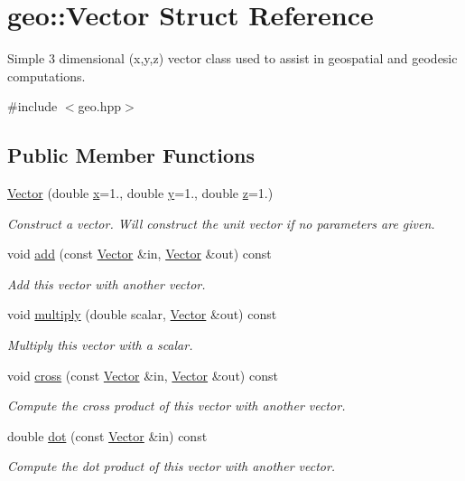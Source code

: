 \hypertarget{structgeo_1_1Vector}{}\section{geo\+:\+:Vector Struct Reference}
\label{structgeo_1_1Vector}


Simple 3 dimensional (x,y,z) vector class used to assist in geospatial and geodesic computations.  




{\ttfamily \#include $<$geo.\+hpp$>$}

\subsection*{Public Member Functions}
\begin{DoxyCompactItemize}
\item 
\hyperlink{structgeo_1_1Vector_abe80c8a529a5562d0efd8258424773eb}{Vector} (double \hyperlink{structgeo_1_1Vector_a92d828b5095e1a99f159d043cc88ce3d}{x}=1., double \hyperlink{structgeo_1_1Vector_ab21926c4f98eeb07d6ad19d1affdb906}{y}=1., double \hyperlink{structgeo_1_1Vector_a27b88a7d57422a7609e011fe921ea500}{z}=1.)
\begin{DoxyCompactList}\small\item\em Construct a vector. Will construct the unit vector if no parameters are given. \end{DoxyCompactList}\item 
void \hyperlink{structgeo_1_1Vector_a27d2f64b051e43dca9e7e920cb041d50}{add} (const \hyperlink{structgeo_1_1Vector}{Vector} \&in, \hyperlink{structgeo_1_1Vector}{Vector} \&out) const 
\begin{DoxyCompactList}\small\item\em Add this vector with another vector. \end{DoxyCompactList}\item 
void \hyperlink{structgeo_1_1Vector_ae93fe864d5eb6ebb960f167757e7d9ce}{multiply} (double scalar, \hyperlink{structgeo_1_1Vector}{Vector} \&out) const 
\begin{DoxyCompactList}\small\item\em Multiply this vector with a scalar. \end{DoxyCompactList}\item 
void \hyperlink{structgeo_1_1Vector_a9afe0c66aadbbb1c740e93aa419b19d5}{cross} (const \hyperlink{structgeo_1_1Vector}{Vector} \&in, \hyperlink{structgeo_1_1Vector}{Vector} \&out) const 
\begin{DoxyCompactList}\small\item\em Compute the cross product of this vector with another vector. \end{DoxyCompactList}\item 
double \hyperlink{structgeo_1_1Vector_a186ede370d236ac2f8d37c17c1999fbf}{dot} (const \hyperlink{structgeo_1_1Vector}{Vector} \&in) const 
\begin{DoxyCompactList}\small\item\em Compute the dot product of this vector with another vector. \end{DoxyCompactList}\end{DoxyCompactItemize}
